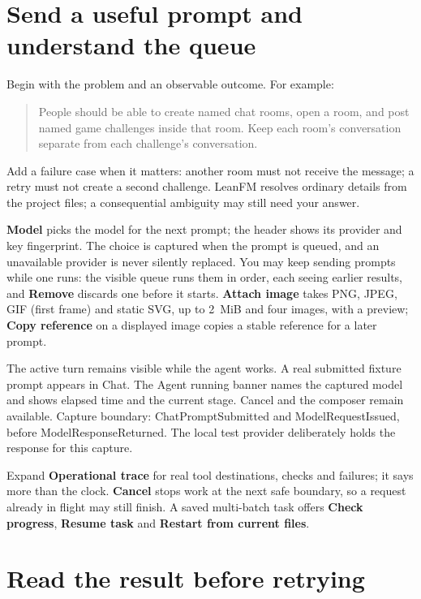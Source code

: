 \section{Send a useful prompt and understand the queue}

Begin with the problem and an observable outcome. For example:
\begin{quote}
People should be able to create named chat rooms, open a room, and post named
game challenges inside that room. Keep each room's conversation separate from
each challenge's conversation.
\end{quote}
Add a failure case when it matters: another room must not receive the message; a
retry must not create a second challenge. LeanFM resolves ordinary details from
the project files; a consequential ambiguity may still need your answer.

\textbf{Model} picks the model for the next prompt; the header shows its provider
and key fingerprint. The choice is captured when the prompt is queued, and an
unavailable provider is never silently replaced. You may keep sending prompts
while one runs: the visible queue runs them in order, each seeing earlier
results, and \textbf{Remove} discards one before it starts. \textbf{Attach image}
takes PNG, JPEG, GIF (first frame) and static SVG, up to 2~MiB and four images,
with a preview; \textbf{Copy reference} on a displayed image copies a stable
reference for a later prompt.

  {The active turn remains visible while the agent works.}
  {A real submitted fixture prompt appears in Chat. The Agent running banner names the captured model and shows elapsed time and the current stage. Cancel and the composer remain available.}
  {Capture boundary: ChatPromptSubmitted and ModelRequestIssued, before ModelResponseReturned. The local test provider deliberately holds the response for this capture.}

Expand \textbf{Operational trace} for real tool destinations, checks and
failures; it says more than the clock. \textbf{Cancel} stops work at the next safe
boundary, so a request already in flight may still finish. A saved multi-batch
task offers \textbf{Check progress}, \textbf{Resume task} and \textbf{Restart from
current files}.

\section{Read the result before retrying}


